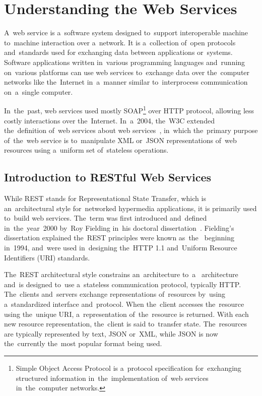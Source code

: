 \section{Understanding the Web Services}
\label{WebServices}
A~web service is a~software system designed to~support interoperable machine
to~machine interaction over a~network. It is a~collection of~open protocols
and~standards used for exchanging data between applications or~systems. Software
applications written in~various programming languages and~running on~various
platforms can use web services to~exchange data over the~computer networks like
the~Internet in~a~manner similar to~interprocess communication on~a~single
computer.

In~the~past, web services used mostly SOAP\footnote{Simple Object Access
Protocol is a~protocol specification for~exchanging structured information
in~the~implementation of~web services in~the~computer networks.} over HTTP
protocol, allowing less costly interactions over the~Internet. In~a~2004,
the~W3C extended the~definition of~web services about  web
services~\cite{W3CWebServices}, in~which the~primary purpose of~the~web service
is to~manipulate XML or~JSON representations of~web resources using a~uniform
set of~stateless operations.

\subsection{Introduction to RESTful Web Services}
While REST stands for Representational State Transfer, which is an~architectural
style for~networked hypermedia applications, it is primarily used to~build web
services. The~term was first introduced and~defined in~the~year~2000 by~Roy
Fielding in~his doctoral dissertation~\cite{Fielding}. Fielding's dissertation
explained the~REST principles were known as~the~ beginning in~1994,
and~were used in~designing the~HTTP 1.1 and~Uniform Resource Identifiers (URI)
standards.

The~REST architectural style constrains an~architecture to~a~
architecture and~is designed to~use a~stateless communication protocol,
typically HTTP. The~clients and~servers exchange representations of~resources
by~using a~standardized interface and~protocol. When the~client accesses
the~resource using the~unique URI, a~representation of~the~resource is returned.
With each new resource representation, the~client is said to~transfer state.
The~resources are typically represented by text, JSON or~XML, while JSON is now
the~currently the~most popular format being used.

